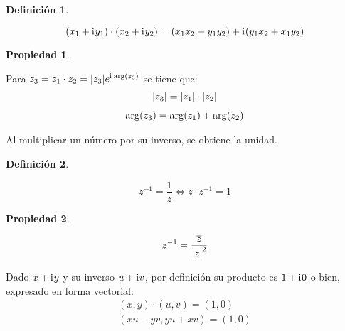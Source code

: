 \documentclass[a5paper,12pt,twoside]{book}
\newtheorem{defn}{{Definición}}[chapter]
\newtheorem{prop}{{Propiedad}}[chapter]
\begin{document}
\begin{mdframed}[style=MyFrame1]
    \begin{defn}
    \end{defn}
    \begin{equation*}
        (x_1 + \mathrm{i}\mkern1mu y_1) \cdot (x_2 + \mathrm{i}\mkern1mu y_2) = (x_1x_2-y_1y_2) + \mathrm{i}\mkern1mu (y_1x_2+x_1y_2)
    \end{equation*}
\end{mdframed}

\begin{mdframed}[style=MyFrame1]
    \begin{prop}
    \end{prop}
    Para $z_3=z_1 \cdot z_2 = {\left| {z_3} \right|} e^{\mathrm{i}\mkern1mu \arg(z_3) } $ se tiene que:
    \begin{gather*}
        {\left| {z_3} \right|} = {\left| {z_1} \right|} \cdot {\left| {z_2} \right|}
        \\[1ex]
        \arg(z_3) = \arg(z_1) + \arg(z_2)
    \end{gather*}
\end{mdframed}

Al multiplicar un número por su inverso, se obtiene la unidad.

\begin{mdframed}[style=MyFrame1]
    \begin{defn}
        \label{defn:Inverse}
    \end{defn}
    \begin{equation*}
        z^{-1}=\frac{1}{z} \iff z \cdot z^{-1} = 1
    \end{equation*}
\end{mdframed}

\begin{mdframed}[style=MyFrame1]
    \begin{prop}
    \end{prop}
    \begin{equation*}
        z^{-1}=\dfrac{\overline{z}}{{\left| {z} \right|}^2}
    \end{equation*}
\end{mdframed}


Dado $x + \mathrm{i}\mkern1mu y$ y su inverso $u + \mathrm{i}\mkern1mu v$, por definición su producto es $1 + \mathrm{i}\mkern1mu 0$ o bien, expresado en forma vectorial:
\begin{gather*}
    (x,y) \cdot (u,v) = (1,0)
    \\
    (xu-yv,yu+xv) = (1,0)
\end{gather*}
\end{document}

